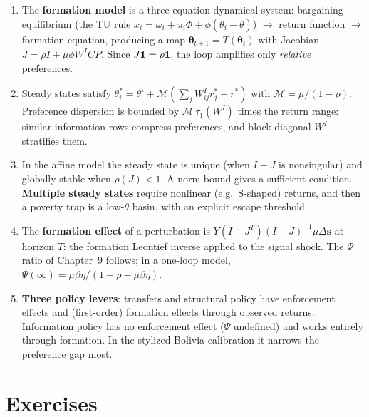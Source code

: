 \documentclass[../structural_economics_book.tex]{subfiles}
\begin{document}
\begin{enumerate}
\item The \textbf{formation model} is a three-equation dynamical system: bargaining equilibrium (the TU rule $x_i = \omega_i + \pi_i\Phi + \phi(\theta_i - \bar{\theta})$) $\to$ return function $\to$ formation equation, producing a map $\boldsymbol{\theta}_{t+1} = T(\boldsymbol{\theta}_t)$ with Jacobian $J = \rho I + \mu\phi W^I C P$. Since $J\mathbf{1} = \rho\mathbf{1}$, the loop amplifies only \textit{relative} preferences.

\item Steady states satisfy $\theta_i^* = \theta^{\circ} + \mathcal{M}(\sum_j W^I_{ij} r_j^* - r^*)$ with $\mathcal{M} = \mu/(1-\rho)$. Preference dispersion is bounded by $\mathcal{M}\,\tau_1(W^I)$ times the return range: similar information rows compress preferences, and block-diagonal $W^I$ stratifies them.

\item In the affine model the steady state is unique (when $I - J$ is nonsingular) and globally stable when $\rho(J) < 1$. A norm bound gives a sufficient condition. \textbf{Multiple steady states} require nonlinear (e.g.\ S-shaped) returns, and then a poverty trap is a low-$\theta$ basin, with an explicit escape threshold.

\item The \textbf{formation effect} of a perturbation is $Y(I - J^T)(I - J)^{-1}\mu\Delta\mathbf{s}$ at horizon $T$: the formation Leontief inverse applied to the signal shock. The $\Psi$ ratio of Chapter~9 follows; in a one-loop model, $\Psi(\infty) = \mu\beta\eta/(1 - \rho - \mu\beta\eta)$.

\item \textbf{Three policy levers}: transfers and structural policy have enforcement effects and (first-order) formation effects through observed returns. Information policy has no enforcement effect ($\Psi$ undefined) and works entirely through formation. In the stylized Bolivia calibration it narrows the preference gap most.
\end{enumerate}


\section{Exercises}
\label{ch10:sec:exercises}
\end{document}
